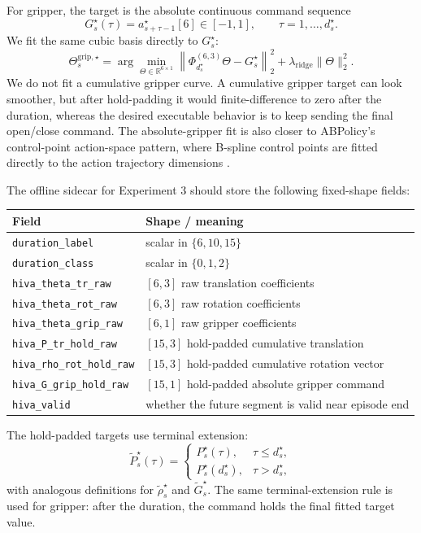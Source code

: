 \documentclass[10pt,twocolumn,letterpaper]{article}
\begin{document}
For gripper, the target is the absolute continuous command sequence
\begin{equation}
G_s^\star(\tau)=a_{s+\tau-1}^{\star}[6]\in[-1,1],
\qquad \tau=1,\ldots,d_s^\star.
\end{equation}
We fit the same cubic basis directly to $G_s^\star$:
\begin{equation}
\Theta_s^{\mathrm{grip},\star}
=\arg\min_{\Theta\in\mathbb{R}^{6\times1}}
\left\|\Phi_{d_s^\star}^{(6,3)}\Theta-G_s^\star\right\|_2^2
+\lambda_{\mathrm{ridge}}\|\Theta\|_2^2.
\end{equation}
We do not fit a cumulative gripper curve. A cumulative gripper target can look smoother, but after hold-padding it would finite-difference to zero after the duration, whereas the desired executable behavior is to keep sending the final open/close command. The absolute-gripper fit is also closer to ABPolicy's control-point action-space pattern, where B-spline control points are fitted directly to the action trajectory dimensions \cite{abpolicy2026}.

The offline sidecar for Experiment 3 should store the following fixed-shape fields:
\begin{center}
\small
\begin{tabular}{@{}ll@{}}
\toprule
Field & Shape / meaning \\
\midrule
\texttt{duration\_label} & scalar in $\{6,10,15\}$ \\
\texttt{duration\_class} & scalar in $\{0,1,2\}$ \\
\texttt{hiva\_theta\_tr\_raw} & $[6,3]$ raw translation coefficients \\
\texttt{hiva\_theta\_rot\_raw} & $[6,3]$ raw rotation coefficients \\
\texttt{hiva\_theta\_grip\_raw} & $[6,1]$ raw gripper coefficients \\
\texttt{hiva\_P\_tr\_hold\_raw} & $[15,3]$ hold-padded cumulative translation \\
\texttt{hiva\_rho\_rot\_hold\_raw} & $[15,3]$ hold-padded cumulative rotation vector \\
\texttt{hiva\_G\_grip\_hold\_raw} & $[15,1]$ hold-padded absolute gripper command \\
\texttt{hiva\_valid} & whether the future segment is valid near episode end \\
\bottomrule
\end{tabular}
\end{center}
The hold-padded targets use terminal extension:
\begin{equation}
\widetilde P_s^\star(\tau)=
\begin{cases}
P_s^\star(\tau), & \tau\le d_s^\star,\\
P_s^\star(d_s^\star), & \tau>d_s^\star,
\end{cases}
\end{equation}
with analogous definitions for $\widetilde\rho_s^\star$ and $\widetilde G_s^\star$. The same terminal-extension rule is used for gripper: after the duration, the command holds the final fitted target value.
\end{document}
